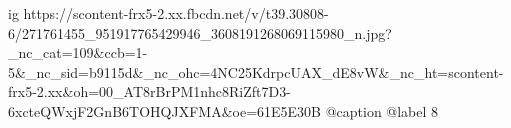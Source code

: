  
 
 
 
 

\ifcmt
  ig https://scontent-frx5-2.xx.fbcdn.net/v/t39.30808-6/271761455_951917765429946_3608191268069115980_n.jpg?_nc_cat=109&ccb=1-5&_nc_sid=b9115d&_nc_ohc=4NC25KdrpcUAX_dE8vW&_nc_ht=scontent-frx5-2.xx&oh=00_AT8rBrPM1nhc8RiZft7D3-6xcteQWxjF2GnB6TOHQJXFMA&oe=61E5E30B
  @caption @label 8
\fi
